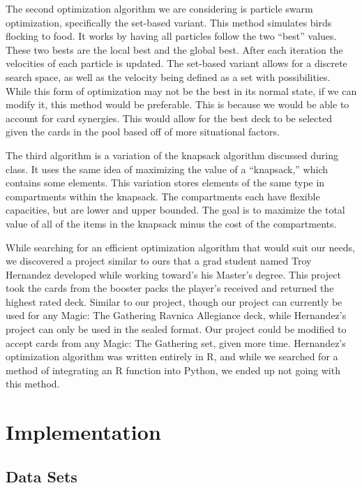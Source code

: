 \documentclass[12pt, letterpaper]{article}
\begin{document}
\label{paragraph:Particle Swarm}
The second optimization algorithm we are considering is particle swarm optimization,
specifically the set-based variant.
This method simulates birds flocking to food.
It works by having all particles follow the two \enquote{best} values.
These two bests are the local best and the global best.
After each iteration the velocities of each particle is updated.
The set-based variant allows for a discrete search space,
as well as the velocity being defined as a set with possibilities.
While this form of optimization may not be the best in its normal state,
if we can modify it, this method would be preferable.
This is because we would be able to account for card synergies.
This would allow for the best deck to be selected given the cards
in the pool based off of more situational factors.

\label{paragraph:Knapsack}
The third algorithm is a variation of the knapsack algorithm discussed during class.
It uses the same idea of maximizing the value of a \enquote{knapsack,}
which contains some elements.
This variation stores elements of the same type in compartments within the knapsack.
The compartments each have flexible capacities, but are lower and upper bounded.
The goal is to maximize the total value of all of the items in the knapsack
minus the cost of the compartments.


While searching for an efficient optimization algorithm that would suit our needs,
we discovered a project similar to ours that a grad student
named Troy Hernandez developed while working toward's his Master's degree.
This project took the cards from the booster packs the player's received
and returned the highest rated deck.
Similar to our project, though our project can currently be used for any Magic: The Gathering
Ravnica Allegiance deck, while Hernandez's project can only be used in the sealed format.
Our project could be modified to accept cards from any Magic: The Gathering set,
given more time.
Hernandez's optimization algorithm was written entirely in R,
and while we searched for a method of integrating an R function
into Python, we ended up not going with this method.

\section{Implementation}

\subsection{Data Sets}
\end{document}
